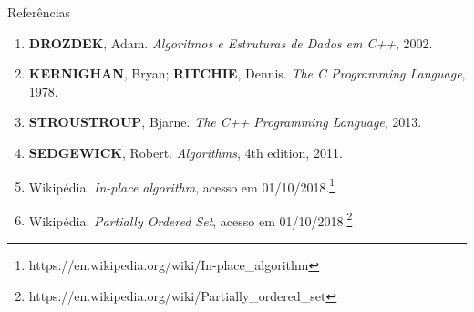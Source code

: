 \begin{frame}[fragile]{Referências}

    \begin{enumerate}
        \item \textbf{DROZDEK}, Adam. \textit{Algoritmos e Estruturas de Dados em C++}, 2002.

        \item \textbf{KERNIGHAN}, Bryan; \textbf{RITCHIE}, Dennis. \textit{The C Programming Language}, 1978.

        \item \textbf{STROUSTROUP}, Bjarne. \textit{The C++ Programming Language}, 2013.

        \item \textbf{SEDGEWICK}, Robert. \textit{Algorithms}, 4th edition, 2011.

        \item Wikipédia. \textit{In-place algorithm}, acesso em 01/10/2018.\footnote{https://en.wikipedia.org/wiki/In-place\_algorithm}

        \item Wikipédia. \textit{Partially Ordered Set}, acesso em 01/10/2018.\footnote{https://en.wikipedia.org/wiki/Partially\_ordered\_set}

    \end{enumerate}

\end{frame}
